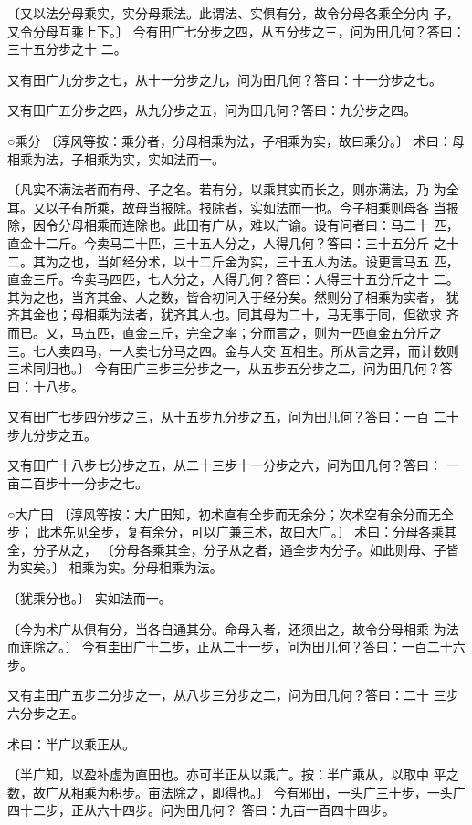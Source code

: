 \documentclass[a4paper,12pt,UTF8,twoside]{ctexbook}
\begin{document}
〔又以法分母乘实，实分母乘法。此谓法、实俱有分，故令分母各乘全分内 子，又令分母互乘上下。〕 今有田广七分步之四，从五分步之三，问为田几何？答曰：三十五分步之十 二。

又有田广九分步之七，从十一分步之九，问为田几何？答曰：十一分步之七。

又有田广五分步之四，从九分步之五，问为田几何？答曰：九分步之四。

○乘分 〔淳风等按：乘分者，分母相乘为法，子相乘为实，故曰乘分。〕 术曰：母相乘为法，子相乘为实，实如法而一。

〔凡实不满法者而有母、子之名。若有分，以乘其实而长之，则亦满法，乃 为全耳。又以子有所乘，故母当报除。报除者，实如法而一也。今子相乘则母各 当报除，因令分母相乘而连除也。此田有广从，难以广谕。设有问者曰：马二十 匹，直金十二斤。今卖马二十匹，三十五人分之，人得几何？答曰：三十五分斤 之十二。其为之也，当如经分术，以十二斤金为实，三十五人为法。设更言马五 匹，直金三斤。今卖马四匹，七人分之，人得几何？答曰：人得三十五分斤之十 二。其为之也，当齐其金、人之数，皆合初问入于经分矣。然则分子相乘为实者， 犹齐其金也；母相乘为法者，犹齐其人也。同其母为二十，马无事于同，但欲求 齐而已。又，马五匹，直金三斤，完全之率；分而言之，则为一匹直金五分斤之 三。七人卖四马，一人卖七分马之四。金与人交 互相生。所从言之异，而计数则 三术同归也。〕 今有田广三步三分步之一，从五步五分步之二，问为田几何？答曰：十八步。

又有田广七步四分步之三，从十五步九分步之五，问为田几何？答曰：一百 二十步九分步之五。

又有田广十八步七分步之五，从二十三步十一分步之六，问为田几何？答曰： 一亩二百步十一分步之七。

○大广田 〔淳风等按：大广田知，初术直有全步而无余分；次术空有余分而无全步； 此术先见全步，复有余分，可以广兼三术，故曰大广。〕 术曰：分母各乘其全，分子从之， 〔分母各乘其全，分子从之者，通全步内分子。如此则母、子皆为实矣。〕 相乘为实。分母相乘为法。

〔犹乘分也。〕 实如法而一。

〔今为术广从俱有分，当各自通其分。命母入者，还须出之，故令分母相乘 为法而连除之。〕 今有圭田广十二步，正从二十一步，问为田几何？答曰：一百二十六步。

又有圭田广五步二分步之一，从八步三分步之二，问为田几何？答曰：二十 三步六分步之五。

术曰：半广以乘正从。

〔半广知，以盈补虚为直田也。亦可半正从以乘广。按：半广乘从，以取中 平之数，故广从相乘为积步。亩法除之，即得也。〕 今有邪田，一头广三十步，一头广四十二步，正从六十四步。问为田几何？ 答曰：九亩一百四十四步。
\end{document}
